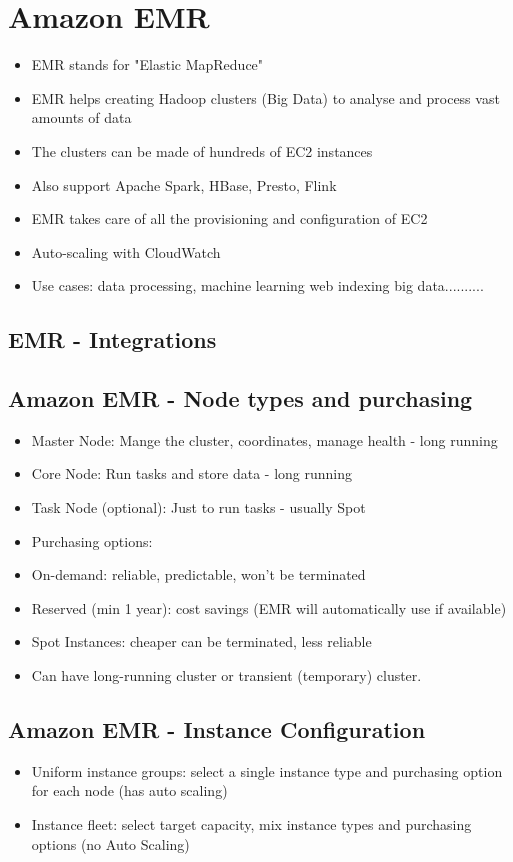\section{Amazon EMR}
\begin{itemize}
    \item EMR stands for "Elastic MapReduce"
    \item EMR helps creating Hadoop clusters (Big Data) to analyse and process vast amounts of data
    \item The clusters can be made of hundreds of EC2 instances
    \item Also support Apache Spark, HBase, Presto, Flink
    \item EMR takes care of all the provisioning and configuration of EC2
    \item Auto-scaling with CloudWatch
    \item Use cases: data processing, machine learning web indexing big data..........
\end{itemize}

\subsection{EMR - Integrations}

\subsection{Amazon EMR - Node types and purchasing}
\begin{itemize}
    \item Master Node: Mange the cluster, coordinates, manage health - long running
    \item Core Node: Run tasks and store data - long running
    \item Task Node (optional): Just to run tasks - usually Spot
    \item Purchasing options:
    \item On-demand: reliable, predictable, won't be terminated
    \item Reserved (min 1 year): cost savings (EMR will automatically use if available)
    \item Spot Instances: cheaper can be terminated, less reliable
    \item Can have long-running cluster or transient (temporary) cluster.
\end{itemize}

\subsection{Amazon EMR - Instance Configuration}
\begin{itemize}
    \item Uniform instance groups: select a single instance type and purchasing option for each node (has auto scaling)
    \item Instance fleet: select target capacity, mix instance types and purchasing options (no Auto Scaling)
\end{itemize}



